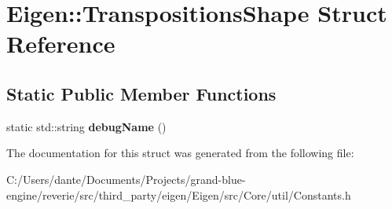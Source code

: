 \hypertarget{struct_eigen_1_1_transpositions_shape}{}\section{Eigen\+::Transpositions\+Shape Struct Reference}
\label{struct_eigen_1_1_transpositions_shape}
\subsection*{Static Public Member Functions}
\begin{DoxyCompactItemize}
\item 
\mbox{\label{struct_eigen_1_1_transpositions_shape_afad8fac6c0338e163cca86f04fe12cdb}} 
static std\+::string {\bfseries debug\+Name} ()
\end{DoxyCompactItemize}


The documentation for this struct was generated from the following file\+:\begin{DoxyCompactItemize}
\item 
C\+:/\+Users/dante/\+Documents/\+Projects/grand-\/blue-\/engine/reverie/src/third\+\_\+party/eigen/\+Eigen/src/\+Core/util/Constants.\+h\end{DoxyCompactItemize}
